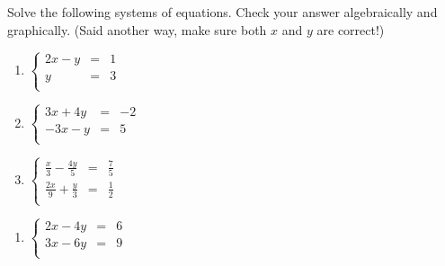 \documentclass{ximera}
\begin{document}
\begin{example} \label{reviewsubelim}  Solve the following systems of equations.  Check your answer algebraically and graphically.  (Said another way, make sure both $x$ and $y$ are correct!)

\begin{multicols}{3}
\begin{enumerate}

\item  $\left\{ \begin{array}{rcr} 2x - y & = & 1 \\ y & = & 3 \\ \end{array} \right.$ 

\item  $\left\{ \begin{array}{rcr} 3x+4y & = & -2  \\ -3x-y & = & 5 \\ \end{array} \right.$ 

\item  $\left\{ \begin{array}{rcr} \frac{x}{3} -\frac{4y}{5} & = & \frac{7}{5} \\ [3pt] 
\frac{2x}{9} + \frac{y}{3} & = & \frac{1}{2} \\ \end{array} \right.$

\setcounter{HW}{\value{enumi}}
\end{enumerate}
\end{multicols}

\begin{multicols}{3}
\begin{enumerate}
\setcounter{enumi}{\value{HW}}

\item  $\left\{ \begin{array}{rcr} 2x - 4y & = & 6 \\ 3x -6y & = & 9\\ \end{array} \right.$ 


\end{enumerate}
\end{multicols}
\end{example}
\end{document}
